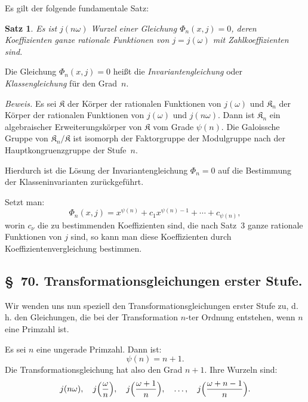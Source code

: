 \documentclass[11pt,a4paper]{article}
\theoremstyle{plain}
\newtheorem*{satz}{Satz}
\theoremstyle{remark}
\begin{document}
Es gilt der folgende fundamentale Satz:
\begin{satz}
Es ist $j(n\omega)$ Wurzel einer Gleichung
$\Phi_n(x,j)=0$, deren Koeffizienten ganze rationale Funktionen
von $j=j(\omega)$ mit Zahlkoeffizienten sind.
\end{satz}

Die Gleichung $\Phi_n(x,j)=0$ heißt die
\emph{Invariantengleichung} oder \emph{Klassengleichung} für den
Grad~$n$.

\textit{Beweis.} Es sei $\mathfrak{K}$ der Körper der rationalen
Funktionen von $j(\omega)$ und $\mathfrak{K}_n$ der Körper der
rationalen Funktionen von $j(\omega)$ und $j(n\omega)$. Dann
ist $\mathfrak{K}_n$ ein algebraischer Erweiterungskörper von
$\mathfrak{K}$ vom Grade $\psi(n)$. Die Galoissche Gruppe von
$\mathfrak{K}_n/\mathfrak{K}$ ist isomorph der Faktorgruppe der
Modulgruppe nach der Hauptkongruenzgruppe der Stufe~$n$.

Hierdurch ist die Lösung der Invariantengleichung $\Phi_n=0$
auf die Bestimmung der Klasseninvarianten zurückgeführt.

Setzt man:
\begin{equation}\label{eq:69:3}
\Phi_n(x,j) = x^{\psi(n)} + c_1 x^{\psi(n)-1} + \cdots
+ c_{\psi(n)},
\end{equation}
worin $c_\nu$ die zu bestimmenden Koeffizienten sind, die nach
Satz~3 ganze rationale Funktionen von $j$ sind, so kann man
diese Koeffizienten durch Koeffizientenvergleichung bestimmen.


\subsection*{§~70. Transformationsgleichungen erster Stufe.}

Wir wenden uns nun speziell den Transformationsgleichungen
erster Stufe zu, d.\,h. den Gleichungen, die bei der
Transformation $n$-ter Ordnung entstehen, wenn $n$ eine Primzahl
ist.

Es sei $n$ eine ungerade Primzahl. Dann ist:
\begin{equation}\label{eq:70:1}
\psi(n) = n+1.
\end{equation}
Die Transformationsgleichung hat also den Grad $n+1$. Ihre
Wurzeln sind:
\begin{equation}\label{eq:70:2}
j(n\omega),\quad
j\Bigl(\frac{\omega}{n}\Bigr),\quad
j\Bigl(\frac{\omega+1}{n}\Bigr),\quad
\dots,\quad
j\Bigl(\frac{\omega+n-1}{n}\Bigr).
\end{equation}
\end{document}
